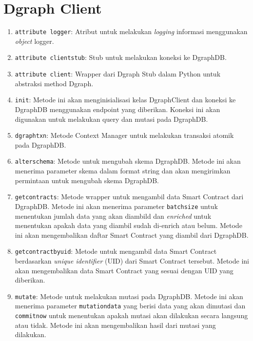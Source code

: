 \chapter{Dgraph Client}
\label{appendix:dgraph-client}

\begin{enumerate}
	\item \texttt{attribute logger}: Atribut untuk melakukan \textit{logging} informasi menggunakan \textit{object} logger.
	\item \texttt{attribute client\textunderscore stub}: Stub untuk melakukan koneksi ke DgraphDB.
	\item \texttt{attribute client}: Wrapper dari Dgraph Stub dalam Python untuk abstraksi method Dgraph.
	\item \texttt{\textunderscore\textunderscore init\textunderscore\textunderscore}: Metode ini akan menginisialisasi kelas DgraphClient dan koneksi ke DgraphDB menggunakan endpoint yang diberikan. Koneksi ini akan digunakan untuk melakukan query dan mutasi pada DgraphDB.
	\item \texttt{dgraph\textunderscore txn}: Metode Context Manager untuk melakukan transaksi atomik pada DgraphDB.
	\item \texttt{alter\textunderscore schema}: Metode untuk mengubah skema DgraphDB. Metode ini akan menerima parameter skema dalam format string dan akan mengirimkan permintaan untuk mengubah skema DgraphDB.
	\item \texttt{get\textunderscore contracts}: Metode wrapper untuk mengambil data Smart Contract dari DgraphDB. Metode ini akan menerima parameter \texttt{batch\textunderscore size} untuk menentukan jumlah data yang akan diambild dan \textit{enriched} untuk menentukan apakah data yang diambil sudah di-enrich atau belum. Metode ini akan mengembalikan daftar Smart Contract yang diambil dari DgraphDB.
	\item \texttt{get\textunderscore contract\textunderscore by\textunderscore uid}: Metode untuk mengambil data Smart Contract berdasarkan \textit{unique identifier} (UID) dari Smart Contract tersebut. Metode ini akan mengembalikan data Smart Contract yang sesuai dengan UID yang diberikan.
	\item \texttt{mutate}: Metode untuk melakukan mutasi pada DgraphDB. Metode ini akan menerima parameter \texttt{mutation\textunderscore data} yang berisi data yang akan dimutasi dan \texttt{commit\textunderscore now} untuk menentukan apakah mutasi akan dilakukan secara langsung atau tidak. Metode ini akan mengembalikan hasil dari mutasi yang dilakukan.

\end{enumerate}
